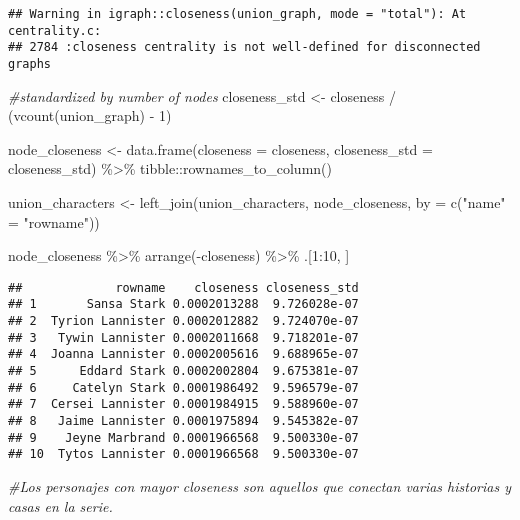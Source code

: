 \documentclass[
]{book}
\newenvironment{Shaded}{\begin{snugshade}}{\end{snugshade}}
\newcommand{\AttributeTok}[1]{\textcolor[rgb]{0.77,0.63,0.00}{#1}}
\newcommand{\CommentTok}[1]{\textcolor[rgb]{0.56,0.35,0.01}{\textit{#1}}}
\newcommand{\DecValTok}[1]{\textcolor[rgb]{0.00,0.00,0.81}{#1}}
\newcommand{\FunctionTok}[1]{\textcolor[rgb]{0.00,0.00,0.00}{#1}}
\newcommand{\NormalTok}[1]{#1}
\newcommand{\OtherTok}[1]{\textcolor[rgb]{0.56,0.35,0.01}{#1}}
\newcommand{\SpecialCharTok}[1]{\textcolor[rgb]{0.00,0.00,0.00}{#1}}
\newcommand{\StringTok}[1]{\textcolor[rgb]{0.31,0.60,0.02}{#1}}
\begin{document}
\begin{verbatim}
## Warning in igraph::closeness(union_graph, mode = "total"): At centrality.c:
## 2784 :closeness centrality is not well-defined for disconnected graphs
\end{verbatim}

\begin{Shaded}
\begin{Highlighting}[]
\CommentTok{\#standardized by number of nodes}
\NormalTok{closeness\_std }\OtherTok{\textless{}{-}}\NormalTok{ closeness }\SpecialCharTok{/}\NormalTok{ (}\FunctionTok{vcount}\NormalTok{(union\_graph) }\SpecialCharTok{{-}} \DecValTok{1}\NormalTok{)}

\NormalTok{node\_closeness }\OtherTok{\textless{}{-}} \FunctionTok{data.frame}\NormalTok{(}\AttributeTok{closeness =}\NormalTok{ closeness,}
                          \AttributeTok{closeness\_std =}\NormalTok{ closeness\_std) }\SpecialCharTok{\%\textgreater{}\%}
\NormalTok{  tibble}\SpecialCharTok{::}\FunctionTok{rownames\_to\_column}\NormalTok{()}

\NormalTok{union\_characters }\OtherTok{\textless{}{-}} \FunctionTok{left\_join}\NormalTok{(union\_characters, node\_closeness, }\AttributeTok{by =} \FunctionTok{c}\NormalTok{(}\StringTok{"name"} \OtherTok{=} \StringTok{"rowname"}\NormalTok{))}

\NormalTok{node\_closeness }\SpecialCharTok{\%\textgreater{}\%}
  \FunctionTok{arrange}\NormalTok{(}\SpecialCharTok{{-}}\NormalTok{closeness) }\SpecialCharTok{\%\textgreater{}\%}
\NormalTok{  .[}\DecValTok{1}\SpecialCharTok{:}\DecValTok{10}\NormalTok{, ]}
\end{Highlighting}
\end{Shaded}

\begin{verbatim}
##             rowname    closeness closeness_std
## 1       Sansa Stark 0.0002013288  9.726028e-07
## 2  Tyrion Lannister 0.0002012882  9.724070e-07
## 3   Tywin Lannister 0.0002011668  9.718201e-07
## 4  Joanna Lannister 0.0002005616  9.688965e-07
## 5      Eddard Stark 0.0002002804  9.675381e-07
## 6     Catelyn Stark 0.0001986492  9.596579e-07
## 7  Cersei Lannister 0.0001984915  9.588960e-07
## 8   Jaime Lannister 0.0001975894  9.545382e-07
## 9    Jeyne Marbrand 0.0001966568  9.500330e-07
## 10  Tytos Lannister 0.0001966568  9.500330e-07
\end{verbatim}

\begin{Shaded}
\begin{Highlighting}[]
\CommentTok{\#Los personajes con mayor closeness son aquellos que conectan varias historias y casas en la serie.}
\end{Highlighting}
\end{Shaded}
\end{document}
